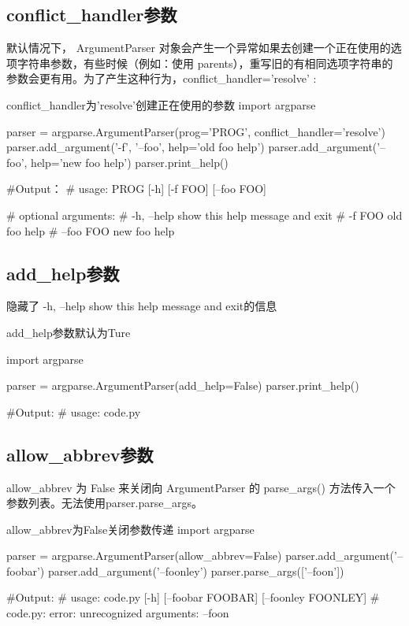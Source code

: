 \documentclass[11pt]{article}
\begin{document}
\subsection{conflict\_handler参数}
 默认情况下， ArgumentParser 对象会产生一个异常如果去创建一个正在使用的选项字符串参数，有些时候（例如：使用 parents），重写旧的有相同选项字符串的参数会更有用。为了产生这种行为，conflict\_handler='resolve' :
 	\begin{Python}{conflict\_handler为'resolve'创建正在使用的参数}
import argparse

parser = argparse.ArgumentParser(prog='PROG', conflict_handler='resolve')
parser.add_argument('-f', '--foo', help='old foo help')
parser.add_argument('--foo', help='new foo help')
parser.print_help()

#Output：
#		usage: PROG [-h] [-f FOO] [--foo FOO]

#		optional arguments:
#		-h, --help  show this help message and exit
#		-f FOO      old foo help
#		--foo FOO   new foo help

 	\end{Python}
\subsection{add\_help参数}
 	隐藏了 -h, --help  show this help message and exit的信息
 	
	\begin{Python}{add\_help参数默认为Ture}
		
import argparse

parser = argparse.ArgumentParser(add_help=False)    
parser.print_help() 

#Output:
#		usage: code.py
	\end{Python}
\subsection{allow\_abbrev参数}
 allow\_abbrev 为 False 来关闭向 ArgumentParser 的 parse\_args() 方法传入一个参数列表。无法使用parser.parse\_args。
 	\begin{Python}{allow\_abbrev为False关闭参数传递}
import argparse

parser = argparse.ArgumentParser(allow_abbrev=False)
parser.add_argument('--foobar')
parser.add_argument('--foonley')
parser.parse_args(['--foon'])

#Output:
#		usage: code.py [-h] [--foobar FOOBAR] [--foonley FOONLEY]
#		code.py: error: unrecognized arguments: --foon
	
 	\end{Python}
 
\end{document}

